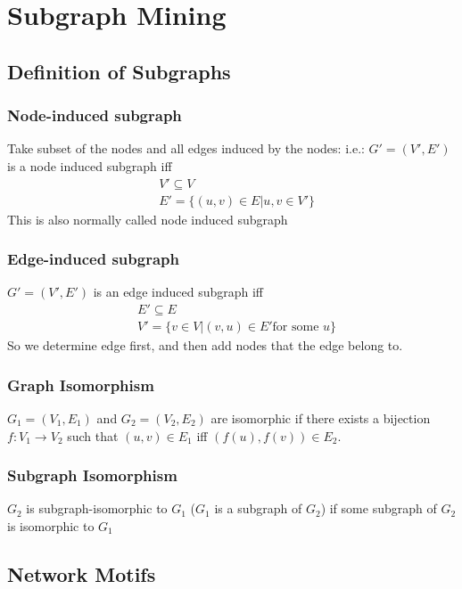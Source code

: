 \chapter{Subgraph Mining} 

\section{Definition of Subgraphs} 

\subsection{Node-induced subgraph} 
Take subset of the nodes and all edges induced by the nodes: i.e.: $G'=(V', E')$ is a node induced subgraph iff
    \begin{align*}
        & V'\subseteq V\\
        & E' = \{ (u,v)\in E | u,v \in V' \}
    \end{align*}
This is also normally called node induced subgraph 

\subsection{Edge-induced subgraph} 
$G'=(V', E')$ is an edge induced subgraph iff
    \begin{align*}
        & E' \subseteq E \\
        & V' = \{ v\in V | (v,u) \in E' \textrm{for some $u$} \} 
    \end{align*}
So we determine edge first, and then add nodes that the edge belong to. 

\subsection{Graph Isomorphism} 
$G_1 = (V_1, E_1)$ and $G_2 = (V_2, E_2)$ are isomorphic if there exists a bijection $f:V_1 \to V_2$ such that $(u,v) \in E_1$ iff $(f(u), f(v))\in E_2$.

\subsection{Subgraph Isomorphism} 
$G_2$ is subgraph-isomorphic to $G_1$ ($G_1$ is a subgraph of $G_2$) if some subgraph of $G_2$ is isomorphic to $G_1$

\section{Network Motifs}
